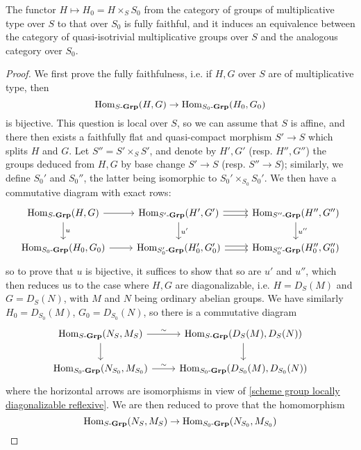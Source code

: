 \begin{proposition}\label{scheme group multiplicative nilideal reduction}
The functor $H\mapsto H_0=H\times_SS_0$ from the category of groups of multiplicative type over $S$ to that over $S_0$ is fully faithful, and it induces an equivalence between the category of quasi-isotrivial multiplicative groups over $S$ and the analogous category over $S_0$.
\end{proposition}
\begin{proof}
We first prove the fully faithfulness, i.e. if $H,G$ over $S$ are of multiplicative type, then
\[\mathrm{Hom}_{S\textup{-}\mathbf{Grp}}(H,G)\to\mathrm{Hom}_{S_0\textup{-}\mathbf{Grp}}(H_0,G_0)\]
is bijective. This question is local over $S$, so we can assume that $S$ is affine, and there then exists a faithfully flat and quasi-compact morphism $S'\to S$ which splits $H$ and $G$. Let $S''=S'\times_SS'$, and denote by $H',G'$ (resp. $H'',G''$) the groups deduced from $H,G$ by base change $S'\to S$ (resp. $S''\to S$); similarly, we define $S_0'$ and $S_0''$, the latter being isomorphic to $S_0'\times_{S_0}S_0'$. We then have a commutative diagram with exact rows:
\[\begin{tikzcd}
\Hom_{S\dash\Grp}(H,G)\ar[d,"u"]\ar[r]&\Hom_{S'\dash\Grp}(H',G')\ar[r,shift left=2pt]\ar[r,shift right=2pt]\ar[d,"u'"]&\Hom_{S''\dash\Grp}(H'',G'')\ar[d,"u''"]\\
\Hom_{S_0\dash\Grp}(H_0,G_0)\ar[r]&\Hom_{S'_0\dash\Grp}(H'_0,G'_0)\ar[r,shift left=2pt]\ar[r,shift right=2pt]&\Hom_{S''_0\dash\Grp}(H''_0,G''_0)
\end{tikzcd}\]
so to prove that $u$ is bijective, it suffices to show that so are $u'$ and $u''$, which then reduces us to the case where $H,G$ are diagonalizable, i.e. $H=D_S(M)$ and $G=D_S(N)$, with $M$ and $N$ being ordinary abelian groups. We have similarly $H_0=D_{S_0}(M)$, $G_0=D_{S_0}(N)$, so there is a commutative diagram
\[\begin{tikzcd}
\Hom_{S\dash\Grp}(N_S,M_S)\ar[r,"\sim"]\ar[d]&\Hom_{S\dash\Grp}(D_S(M),D_S(N))\ar[d]\\
\Hom_{S_0\dash\Grp}(N_{S_0},M_{S_0})\ar[r,"\sim"]&\Hom_{S_0\dash\Grp}(D_{S_0}(M),D_{S_0}(N))
\end{tikzcd}\]
where the horizontal arrows are isomorphisms in view of \cref{scheme group locally diagonalizable reflexive}. We are then reduced to prove that the homomorphism
\begin{equation}\label{scheme group multiplicative nilideal reduction-1}
\mathrm{Hom}_{S\textup{-}\mathbf{Grp}}(N_S,M_S)\to\mathrm{Hom}_{S_0\textup{-}\mathbf{Grp}}(N_{S_0},M_{S_0})
\end{equation}

\end{proof}

